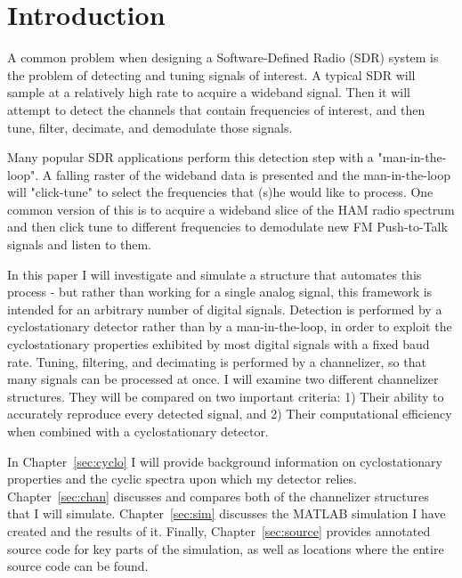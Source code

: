 \documentclass[12pt,dvips]{report}
\begin{document}
\pagestyle{myheadings}

\chapter{Introduction}
\label{sec:intro}

A common problem when designing a Software-Defined Radio (SDR) system is the problem of detecting and tuning signals of interest. A typical SDR will sample at a relatively high rate to acquire a wideband signal. Then it will attempt to detect the channels that contain frequencies of interest, and then tune, filter, decimate, and demodulate those signals. 

Many popular SDR applications perform this detection step with a "man-in-the-loop".  A falling raster of the wideband data is presented and the man-in-the-loop will "click-tune" to select  the frequencies that (s)he would like to process. One common version of this is to acquire a wideband slice of the HAM radio spectrum and then click tune to different frequencies to demodulate new FM Push-to-Talk signals and listen to them.

In this paper I will investigate and simulate a structure that automates this process - but rather than working for a single analog signal, this framework is intended for an arbitrary number of digital signals. Detection is performed by a cyclostationary detector rather than by a man-in-the-loop, in order to exploit the cyclostationary properties exhibited by most digital signals with a fixed baud rate.  Tuning, filtering, and decimating is performed by a channelizer, so that many signals can be processed at once.  I will examine two different channelizer structures. They will be compared on two important criteria: 1) Their ability to accurately reproduce every detected signal, and 2) Their computational efficiency when combined with a cyclostationary detector.

In Chapter~\ref{sec:cyclo} I will provide background information on cyclostationary properties and the cyclic spectra upon which my detector relies.  Chapter~\ref{sec:chan} discusses and compares both of the channelizer structures that I will simulate. Chapter~\ref{sec:sim}  discusses the MATLAB simulation I have created and the results of it. Finally, Chapter~\ref{sec:source} provides annotated source code for key parts of the simulation, as well as locations where the entire source code can be found.
\end{document}
